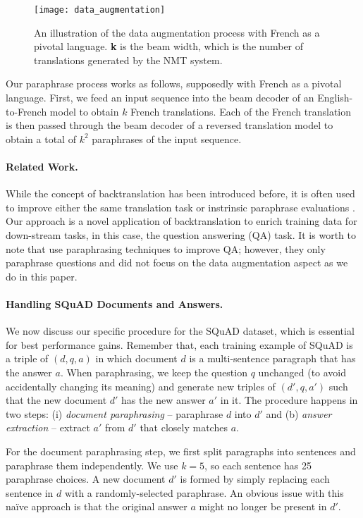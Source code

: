 \documentclass{article} \usepackage{iclr2018_conference,times}
\begin{document}
\begin{figure}[!ht]
 \centering
 \texttt{[image: data\_augmentation]}
 \caption{An illustration of the data augmentation process with French as a pivotal language. \textbf{k} is the beam width, which is the number of translations generated by the NMT system.}
\label{data_augmentation}
\end{figure}

Our paraphrase process works as follows, supposedly with French as a pivotal language. First, we feed an input sequence into the beam decoder of an English-to-French model to obtain $k$ French translations. Each of the French translation is then passed through the beam decoder of a reversed translation model to obtain a total of $k^2$ paraphrases of the input sequence. 

\paragraph{Related Work.} While the concept of backtranslation has been introduced before, it is often used to improve either the same translation task \citet{sennrich16} or instrinsic paraphrase evaluations \citet{wieting17,paranet17}. Our approach is a novel application of backtranslation to enrich training data for down-stream tasks, in this case, the question answering (QA) task.  
It is worth to note that \citep{li17} use paraphrasing techniques to improve QA; however, they only paraphrase questions and did not focus on the data augmentation aspect as we do in this paper.

\paragraph{Handling SQuAD Documents and Answers.}
We now discuss our specific procedure for the SQuAD dataset, which is essential for best performance gains. Remember that, each training example of SQuAD is a triple of $(d, q, a)$ in which document $d$ is a multi-sentence paragraph that has the answer $a$. When paraphrasing, we keep the question $q$ unchanged (to avoid accidentally changing its meaning) and generate new triples of $(d', q, a')$ such that the new document $d'$ has the new answer $a'$ in it. The procedure happens in two steps: (i) {\it document paraphrasing} -- paraphrase $d$ into $d'$ and (b) {\it answer extraction} -- extract $a'$ from $d'$ that closely matches $a$.

For the document paraphrasing step, we first split paragraphs into sentences and paraphrase them independently. We use $k=5$, so each sentence has 25 paraphrase choices. A new document $d'$ is formed by simply replacing each sentence in $d$ with a randomly-selected paraphrase. An obvious issue with this na\"{i}ve approach is that the original answer $a$ might no longer be present in $d'$.
\end{document}
